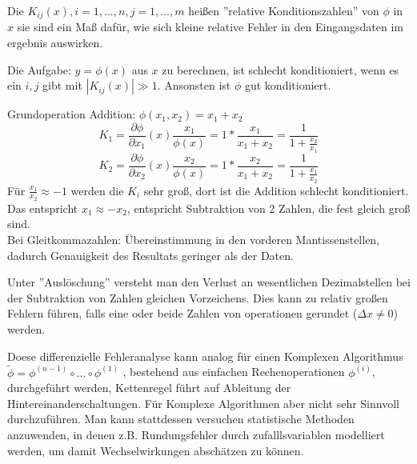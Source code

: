 \begin{definition} Die $K_{ij}(x), i=1,...,n, j=1,...,m$ heißen ''relative Konditionszahlen'' von $\phi$ in $x$ sie sind ein Maß dafür, wie sich kleine relative Fehler in den Eingangsdaten im ergebnis auswirken.
\end{definition}
Die Aufgabe: $y=\phi (x)$ aus $x$ zu berechnen, ist schlecht konditioniert, wenn es ein $i,j$ gibt mit $|K_{ij}(x)| \gg 1$. Ansonsten ist $\phi$ gut konditioniert.\\
\begin{example}
    
 Grundoperation Addition: $\phi(x_1,x_2) = x_1+x_2$\\
$$K_1= \frac{\partial \phi}{\partial x_1}(x)\frac{x_1}{\phi(x)}= 1*\frac{x_1}{x_1+x_2} =\frac{1}{1+\frac{x_2}{x_1}}$$
$$K_2=\frac{\partial \phi}{\partial x_2}(x)\frac{x_2}{\phi(x)}= 1*\frac{x_2}{x_1+x_2} =\frac{1}{1+\frac{x_1}{x_2}}$$
Für $\frac{x_1}{x_2}\approx -1$ werden die $K_i$ sehr groß, dort ist die Addition schlecht konditioniert. \\
Das entspricht $x_1\approx -x_2$, entspricht Subtraktion von 2 Zahlen, die fest gleich groß sind.\\
Bei Gleitkommazahlen: Übereinstimmung in den  vorderen Mantissenstellen, dadurch Genauigkeit des Resultats geringer als der Daten.\\
\end{example}
\begin{definition}
Unter ''Auslöschung'' versteht man den Verlust an wesentlichen Dezimalstellen bei der Subtraktion von Zahlen gleichen Vorzeichens.
Dies kann zu relativ großen Fehlern führen, falls eine oder beide Zahlen von operationen gerundet ($\Delta x \neq 0$) werden.
\end{definition}
\begin{remark}
Doese differenzielle Fehleranalyse kann analog für einen Komplexen Algorithmus $\tilde{\phi}= \phi^{(n-1)}\circ ... \circ \phi^{(1)}$ ,
bestehend aus einfachen Rechenoperationen $\phi^{(i)}$, durchgeführt werden, Kettenregel führt auf Ableitung der Hintereinanderschaltungen.
Für Komplexe Algorithmen aber nicht sehr Sinnvoll durchzuführen. Man kann stattdessen versuchen statistische Methoden anzuwenden,
in denen z.B. Rundungsfehler durch zufalllsvariablen modelliert werden, um damit Wechselwirkungen abschätzen zu können.
\end{remark}
